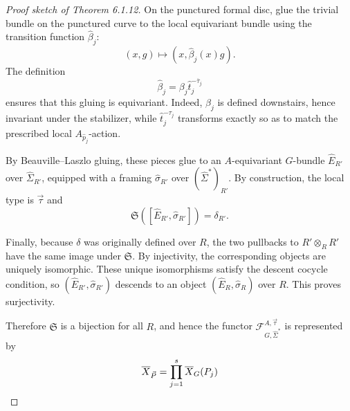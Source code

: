 \documentclass[12pt]{article}
\begin{document}
\begin{proof}[Proof sketch of Theorem 6.1.12]
On the punctured formal disc, glue the trivial bundle on the punctured curve to the local equivariant bundle using the transition function $\widehat\beta_j$:
\[
(x,g)\longmapsto (x,\widehat\beta_j(x)g).
\]
The definition
\[
\widehat\beta_j=\beta_j\widehat t_j^{-\overline\tau_j}
\]
ensures that this gluing is equivariant. Indeed, $\beta_j$ is defined downstairs, hence invariant under the stabilizer, while $\widehat t_j^{-\tau_j}$ transforms exactly so as to match the prescribed local $A_{\widehat p_j}$-action.

By Beauville--Laszlo gluing, these pieces glue to an $A$-equivariant $G$-bundle $\widehat E_{R'}$ over $\widehat\Sigma_{R'}$, equipped with a framing $\widehat\sigma_{R'}$ over $(\widehat\Sigma^*)_{R'}$. By construction, the local type is $\vec\tau$ and
\[
\mathfrak S([\widehat E_{R'},\widehat\sigma_{R'}])=\delta_{R'}.
\]

Finally, because $\delta$ was originally defined over $R$, the two pullbacks to $R'\otimes_R R'$ have the same image under $\mathfrak S$. By injectivity, the corresponding objects are uniquely isomorphic. These unique isomorphisms satisfy the descent cocycle condition, so $(\widehat E_{R'},\widehat\sigma_{R'})$ descends to an object $(\widehat E_R,\widehat\sigma_R)$ over $R$. This proves surjectivity.

Therefore $\mathfrak S$ is a bijection for all $R$, and hence the functor $\mathcal F^{A,\vec\tau}_{G,\widehat\Sigma^*}$ is represented by
\[
\overline X_{\vec P}
=
\prod_{j=1}^s \overline X_G(P_j) \qedhere
\]
\end{proof}
\end{document}
